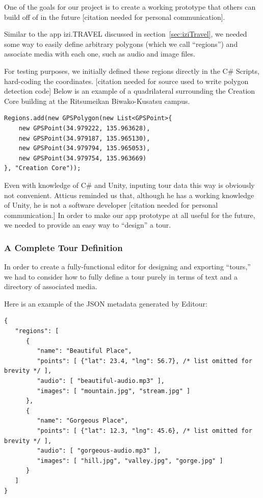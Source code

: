 \documentclass[a4paper, 10pt, american, titlepage]{article}
\begin{document}
One of the goals for our project is to create a working prototype that others
can build off of in the future [citation needed for personal communication].

Similar to the app izi.TRAVEL discussed in section~\ref{sec:iziTravel}, we
needed some way to easily define arbitrary polygons (which we call ``regions'')
and associate media with each one, such as audio and image files.

For testing purposes, we initially defined these regions directly in the C\#
Scripts, hard-coding the coordinates. [citation needed for source used to
write polygon detection code] Below is an example of a quadrilateral
surrounding the Creation Core building at the Ritsumeikan Biwako-Kusatsu
campus.

\begin{verbatim}
Regions.add(new GPSPolygon(new List<GPSPoint>{
    new GPSPoint(34.979222, 135.963628),
    new GPSPoint(34.979187, 135.965130),
    new GPSPoint(34.979794, 135.965053),
    new GPSPoint(34.979754, 135.963669)
}, "Creation Core"));
\end{verbatim}

Even with knowledge of C\# and Unity, inputing tour data this way is obviously
not convenient. Atticus reminded us that, although he has a working knowledge
of Unity, he is not a software developer [citation needed for personal
communication.] In order to make our app prototype at all useful for the
future, we needed to provide an easy way to ``design'' a tour.

\subsubsection{A Complete Tour Definition}
\label{sec:tourDefinition}

In order to create a fully-functional editor for designing and exporting
``tours,'' we had to consider how to fully define a tour purely in terms
of text and a directory of associated media.

Here is an example of the JSON metadata generated by Editour:

\begin{verbatim}
{
   "regions": [
      {
         "name": "Beautiful Place",
         "points": [ {"lat": 23.4, "lng": 56.7}, /* list omitted for brevity */ ],
         "audio": [ "beautiful-audio.mp3" ],
         "images": [ "mountain.jpg", "stream.jpg" ]
      },
      {
         "name": "Gorgeous Place",
         "points": [ {"lat": 12.3, "lng": 45.6}, /* list omitted for brevity */ ],
         "audio": [ "gorgeous-audio.mp3" ],
         "images": [ "hill.jpg", "valley.jpg", "gorge.jpg" ]
      }
   ]
}
\end{verbatim}
\end{document}

